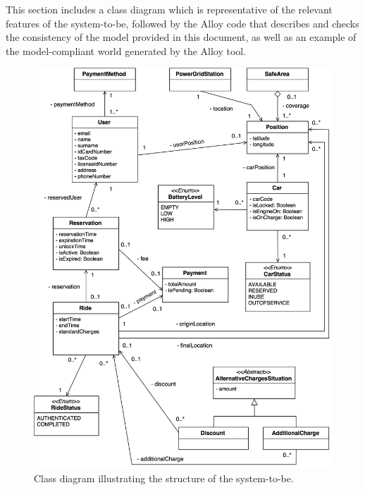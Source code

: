 This section includes a class diagram which is representative of the relevant features of the system-to-be, followed by the Alloy code that describes and checks the consistency of the model provided in this document, as well as an example of the model-compliant world generated by the Alloy tool.

\begin{figure}[H]
\begin{center}
		\includegraphics[width=\textwidth]{./pictures/class_diagram.png}
		\caption{Class diagram illustrating the structure of the system-to-be.}
		\label{class_diagram}
\end{center}
\end{figure}

\newpage


